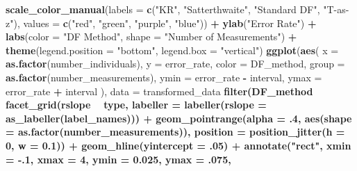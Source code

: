 \documentclass[12pt, twoside]{amherstthesis}
\newenvironment{Shaded}{\begin{snugshade}}{\end{snugshade}}
\newcommand{\DataTypeTok}[1]{\textcolor[rgb]{0.13,0.29,0.53}{#1}}
\newcommand{\DecValTok}[1]{\textcolor[rgb]{0.00,0.00,0.81}{#1}}
\newcommand{\FloatTok}[1]{\textcolor[rgb]{0.00,0.00,0.81}{#1}}
\newcommand{\KeywordTok}[1]{\textcolor[rgb]{0.13,0.29,0.53}{\textbf{#1}}}
\newcommand{\NormalTok}[1]{#1}
\newcommand{\OperatorTok}[1]{\textcolor[rgb]{0.81,0.36,0.00}{\textbf{#1}}}
\newcommand{\StringTok}[1]{\textcolor[rgb]{0.31,0.60,0.02}{#1}}
\begin{document}
\begin{Shaded}
\begin{Highlighting}[]
{{{{{{{{{{{{{\StringTok{  }\KeywordTok{scale_color_manual}\NormalTok{(}\DataTypeTok{labels =} \KeywordTok{c}\NormalTok{(}\StringTok{"KR"}\NormalTok{, }\StringTok{"Satterthwaite"}\NormalTok{, }
                                \StringTok{"Standard DF"}\NormalTok{, }\StringTok{"T-as-z"}\NormalTok{), }
                     \DataTypeTok{values =} \KeywordTok{c}\NormalTok{(}\StringTok{"red"}\NormalTok{, }\StringTok{"green"}\NormalTok{, }\StringTok{"purple"}\NormalTok{, }\StringTok{"blue"}\NormalTok{)) }\OperatorTok{+}
\StringTok{  }\KeywordTok{ylab}\NormalTok{(}\StringTok{"Error Rate"}\NormalTok{) }\OperatorTok{+}
\StringTok{  }\KeywordTok{labs}\NormalTok{(}\DataTypeTok{color =} \StringTok{"DF Method"}\NormalTok{, }\DataTypeTok{shape =} \StringTok{"Number of Measurements"}\NormalTok{) }\OperatorTok{+}
\StringTok{  }\KeywordTok{theme}\NormalTok{(}\DataTypeTok{legend.position =} \StringTok{"bottom"}\NormalTok{, }\DataTypeTok{legend.box =} \StringTok{"vertical"}\NormalTok{)}
\KeywordTok{ggplot}\NormalTok{(}\KeywordTok{aes}\NormalTok{(}
  \DataTypeTok{x =} \KeywordTok{as.factor}\NormalTok{(number_individuals), }\DataTypeTok{y =}\NormalTok{ error_rate,}
  \DataTypeTok{color =}\NormalTok{ DF_method, }\DataTypeTok{group =} \KeywordTok{as.factor}\NormalTok{(number_measurements), }
  \DataTypeTok{ymin =}\NormalTok{ error_rate }\OperatorTok{-}\StringTok{ }\NormalTok{interval, }\DataTypeTok{ymax =}\NormalTok{ error_rate }\OperatorTok{+}\StringTok{ }\NormalTok{interval}
\NormalTok{), }\DataTypeTok{data =}\NormalTok{ transformed_data }\OperatorTok{%>%}\StringTok{ }
\StringTok{  }\KeywordTok{filter}\NormalTok{(DF_method }\OperatorTok{%in%}\StringTok{ }\KeywordTok{c}\NormalTok{(}\StringTok{"KR_t1err_1"}\NormalTok{, }\StringTok{"S_t1err_1"}\NormalTok{))) }\OperatorTok{+}
\StringTok{  }\KeywordTok{facet_grid}\NormalTok{(rslope }\OperatorTok{~}\StringTok{ }\NormalTok{type,}
             \DataTypeTok{labeller =} \KeywordTok{labeller}\NormalTok{(}\DataTypeTok{rslope =} \KeywordTok{as_labeller}\NormalTok{(label_names))) }\OperatorTok{+}
\StringTok{  }\KeywordTok{geom_pointrange}\NormalTok{(}\DataTypeTok{alpha =} \FloatTok{.4}\NormalTok{, }\KeywordTok{aes}\NormalTok{(}\DataTypeTok{shape =} \KeywordTok{as.factor}\NormalTok{(number_measurements)), }
                  \DataTypeTok{position =} \KeywordTok{position_jitter}\NormalTok{(}\DataTypeTok{h =} \DecValTok{0}\NormalTok{, }\DataTypeTok{w =} \FloatTok{0.1}\NormalTok{)) }\OperatorTok{+}
\StringTok{  }\KeywordTok{geom_hline}\NormalTok{(}\DataTypeTok{yintercept =} \FloatTok{.05}\NormalTok{) }\OperatorTok{+}
\StringTok{  }\KeywordTok{annotate}\NormalTok{(}\StringTok{"rect"}\NormalTok{, }\DataTypeTok{xmin =} \FloatTok{-.1}\NormalTok{, }\DataTypeTok{xmax =} \DecValTok{4}\NormalTok{, }\DataTypeTok{ymin =} \FloatTok{0.025}\NormalTok{, }\DataTypeTok{ymax =} \FloatTok{.075}\NormalTok{, }
}}}}}}}}}}}}}}}
\end{Highlighting}
\end{Shaded}
\end{document}
